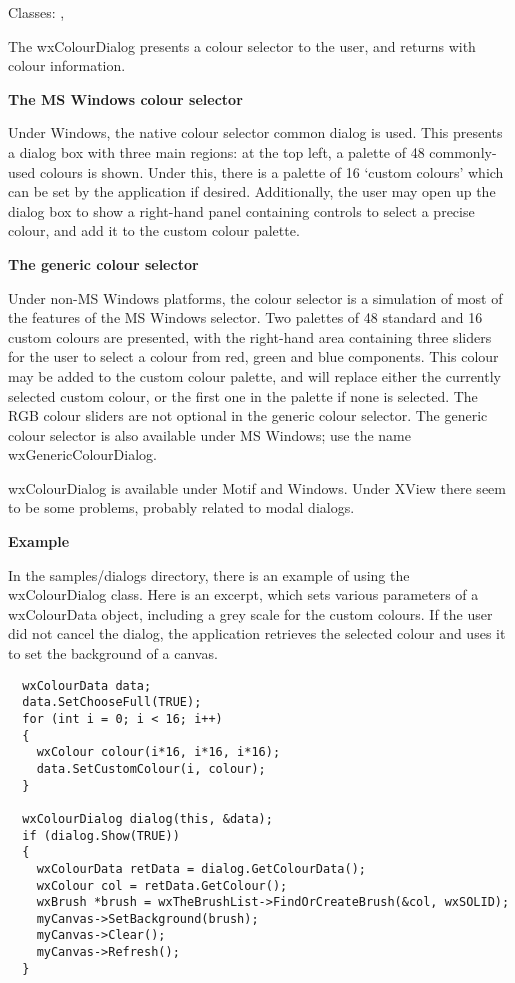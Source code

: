 Classes: , 

The wxColourDialog presents a colour selector to the user, and returns
with colour information.

{\bf The MS Windows colour selector}

Under Windows, the native colour selector common dialog is used. This
presents a dialog box with three main regions: at the top left, a
palette of 48 commonly-used colours is shown. Under this, there is a
palette of 16 `custom colours' which can be set by the application if
desired. Additionally, the user may open up the dialog box to show
a right-hand panel containing controls to select a precise colour, and add
it to the custom colour palette.

{\bf The generic colour selector}

Under non-MS Windows platforms, the colour selector is a simulation of
most of the features of the MS Windows selector. Two palettes of 48
standard and 16 custom colours are presented, with the right-hand area
containing three sliders for the user to select a colour from red,
green and blue components. This colour may be added to the custom colour
palette, and will replace either the currently selected custom colour,
or the first one in the palette if none is selected. The RGB colour sliders
are not optional in the generic colour selector. The generic colour
selector is also available under MS Windows; use the name
wxGenericColourDialog.

wxColourDialog is available under Motif and Windows. Under XView there
seem to be some problems, probably related to modal dialogs.

{\bf Example}

In the samples/dialogs directory, there is an example of using
the wxColourDialog class. Here is an excerpt, which
sets various parameters of a wxColourData object, including
a grey scale for the custom colours. If the user did not cancel
the dialog, the application retrieves the selected colour and
uses it to set the background of a canvas.

\begin{verbatim}
  wxColourData data;
  data.SetChooseFull(TRUE);
  for (int i = 0; i < 16; i++)
  {
    wxColour colour(i*16, i*16, i*16);
    data.SetCustomColour(i, colour);
  }
      
  wxColourDialog dialog(this, &data);
  if (dialog.Show(TRUE))
  {
    wxColourData retData = dialog.GetColourData();
    wxColour col = retData.GetColour();
    wxBrush *brush = wxTheBrushList->FindOrCreateBrush(&col, wxSOLID);
    myCanvas->SetBackground(brush);
    myCanvas->Clear();
    myCanvas->Refresh();
  }
\end{verbatim}

